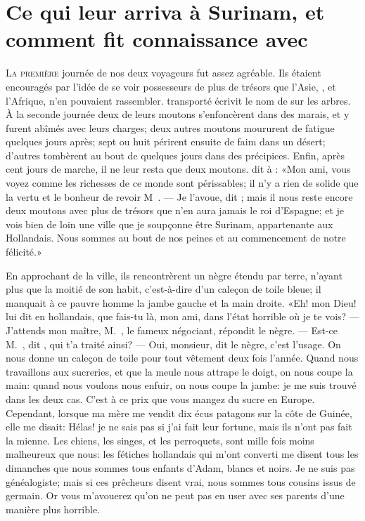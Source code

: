 \chapter[Ce qui leur arriva à Surinam…]{Ce qui leur arriva à Surinam, et comment  fit connaissance avec
}


\lettrine{L}{a première} journée de nos deux voyageurs fut assez agréable. Ils
étaient encouragés par l’idée de se voir possesseurs de plus de trésors
que l’Asie, , et l’Afrique, n’en pouvaient rassembler. 
transporté écrivit le nom de  sur les arbres. À la seconde
journée deux de leurs moutons s’enfoncèrent dans des marais, et y
furent abîmés avec leurs charges; deux autres moutons moururent de
fatigue quelques jours après; sept ou huit périrent ensuite de faim
dans un désert; d’autres tombèrent au bout de quelques jours dans des
précipices. Enfin, après cent jours de marche, il ne leur resta que
deux moutons.  dit à : «Mon ami, vous voyez comme les
richesses de ce monde sont périssables; il n’y a rien de solide que la
vertu et le bonheur de revoir M~. — Je l’avoue, dit
; mais il nous reste encore deux moutons avec plus de trésors
que n’en aura jamais le roi d’Espagne; et je vois bien de loin une
ville que je soupçonne être Surinam, appartenante aux Hollandais. Nous
sommes au bout de nos peines et au commencement de notre félicité.»

En approchant de la ville, ils rencontrèrent un nègre étendu par terre,
n’ayant plus que la moitié de son habit, c’est-à-dire d’un caleçon de
toile bleue; il manquait à ce pauvre homme la jambe gauche et la main
droite. «Eh! mon Dieu! lui dit  en hollandais, que fais-tu là,
mon ami, dans l’état horrible où je te vois? — J’attends mon maître, M.~, le fameux négociant, répondit le nègre. — Est-ce M.~, dit , qui t’a traité ainsi? — Oui, monsieur, dit le
nègre, c’est l’usage. On nous donne un caleçon de toile pour tout
vêtement deux fois l’année. Quand nous travaillons aux sucreries, et
que la meule nous attrape le doigt, on nous coupe la main: quand nous
voulons nous enfuir, on nous coupe la jambe: je me suis trouvé dans les
deux cas. C’est à ce prix que vous mangez du sucre en Europe.
Cependant, lorsque ma mère me vendit dix écus patagons sur la côte de
Guinée, elle me disait: \localleftbox{} Hélas! je ne sais pas si j’ai fait leur fortune, mais
ils n’ont pas fait la mienne. Les chiens, les singes, et les
perroquets, sont mille fois moins malheureux que nous: les fétiches
hollandais qui m’ont converti me disent tous les dimanches que nous
sommes tous enfants d’Adam, blancs et noirs. Je ne suis pas
généalogiste; mais si ces prêcheurs disent vrai, nous sommes tous
cousins issus de germain. Or vous m’avouerez qu’on ne peut pas en user
avec ses parents d’une manière \linebreak plus horrible.


